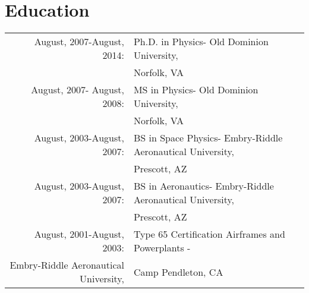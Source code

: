 \documentclass[12pt]{report}
\begin{document}
\section*{Education}
\begin{flushleft}
\begin{tabular}{rl}	
August, 2007-August, 2014:  &Ph.D. in Physics- Old Dominion University,\\& Norfolk, VA\\


August, 2007- August, 2008:& MS in Physics- Old Dominion University,\\& Norfolk, VA\\

August, 2003-August, 2007: &BS in Space Physics- Embry-Riddle Aeronautical  University,\\& Prescott, AZ\\

August, 2003-August, 2007: &BS in Aeronautics- Embry-Riddle Aeronautical  University,\\& Prescott, AZ\\

August, 2001-August, 2003: &Type 65 Certification Airframes and Powerplants -\\ Embry-Riddle Aeronautical  University, & Camp Pendleton, CA\\

\end{tabular}
\end{flushleft}
\end{document}
